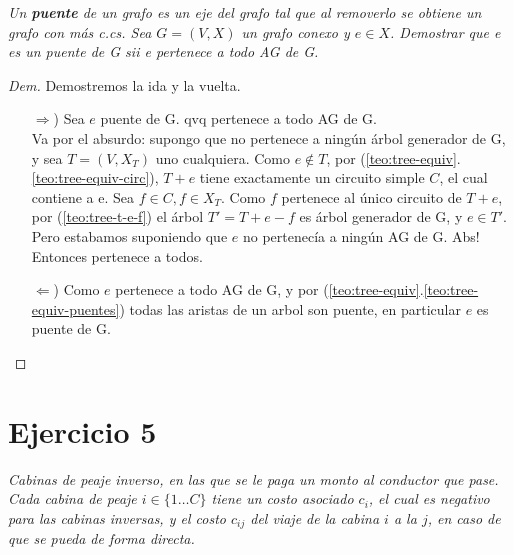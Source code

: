 \documentclass[12pt, a4paper]{report}
\theoremstyle{definition} %
\begin{document}
\textit{Un \textbf{puente} de un grafo es un eje del grafo tal que al removerlo
se obtiene un grafo con más c.cs. Sea $G = (V, X)$ un grafo conexo y $e \in X$.
Demostrar que e es un puente de G sii e pertenece a todo AG de G.}

\begin{proof}[Dem]
    Demostremos la ida y la vuelta.

    \begin{enumerate}
        \item[$\Rightarrow$)] Sea $e$ puente de G. qvq pertenece a todo AG de G.\\
        Va por el absurdo: supongo que no pertenece a ningún árbol generador de G, y sea $T = (V, X_T)$ uno cualquiera. Como $e \notin T$, por (\ref{teo:tree-equiv}.\ref{teo:tree-equiv-circ}), $T + e$ tiene exactamente un circuito simple $C$, el cual contiene a e. Sea $f \in C, f \in X_T$. Como $f$ pertenece al único circuito de $T + e$, por (\ref{teo:tree-t-e-f}) el árbol $T' = T + e - f$ es árbol generador de G, y $e \in T'$. Pero estabamos suponiendo que $e$ no pertenecía a ningún AG de G. Abs! Entonces pertenece a todos.

        \item[$\Leftarrow$)] Como $e$ pertenece a todo AG de G, y por
        (\ref{teo:tree-equiv}.\ref{teo:tree-equiv-puentes}) todas las aristas de un arbol son puente, en particular $e$ es puente de G.
    \end{enumerate}

\end{proof}

\section*{Ejercicio 5}

\textit{Cabinas de peaje inverso, en las que se le paga un monto al conductor que pase. Cada cabina de peaje $i \in \{1 \dotso C \}$ tiene un costo asociado $c_i$, el cual es negativo para las cabinas inversas, y el costo $c_{ij}$ del viaje de la cabina $i$ a la $j$, en caso de que se pueda de forma directa.}
\end{document}
